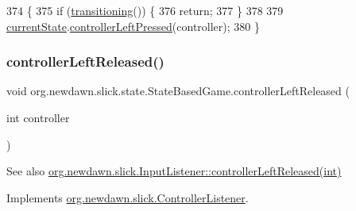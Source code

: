 \begin{DoxyCode}
374                                                       \{
375         \textcolor{keywordflow}{if} (\mbox{\hyperlink{classorg_1_1newdawn_1_1slick_1_1state_1_1_state_based_game_ae869c08778875776081935a090d4c92f}{transitioning}}()) \{
376             \textcolor{keywordflow}{return};
377         \}
378         
379         \mbox{\hyperlink{classorg_1_1newdawn_1_1slick_1_1state_1_1_state_based_game_a6a45e68094bb9b7ec30b8a8b7d415766}{currentState}}.\mbox{\hyperlink{interfaceorg_1_1newdawn_1_1slick_1_1_controller_listener_abfb38c5d8e44b7613a49cbfaf19d5585}{controllerLeftPressed}}(controller);
380     \}
\end{DoxyCode}
\mbox{\label{classorg_1_1newdawn_1_1slick_1_1state_1_1_state_based_game_ae3b66d6b132b6622fa13c125f806e30b}} 
\subsubsection{\texorpdfstring{controller\+Left\+Released()}{controllerLeftReleased()}}
{\footnotesize\ttfamily void org.\+newdawn.\+slick.\+state.\+State\+Based\+Game.\+controller\+Left\+Released (\begin{DoxyParamCaption}\item[{int}]{controller }\end{DoxyParamCaption})\hspace{0.3cm}{\ttfamily [inline]}}

\begin{DoxySeeAlso}{See also}
\mbox{\hyperlink{interfaceorg_1_1newdawn_1_1slick_1_1_controller_listener_ad2f898f0efe21771a0d9568c454dea0d}{org.\+newdawn.\+slick.\+Input\+Listener\+::controller\+Left\+Released(int)}} 
\end{DoxySeeAlso}


Implements \mbox{\hyperlink{interfaceorg_1_1newdawn_1_1slick_1_1_controller_listener_ad2f898f0efe21771a0d9568c454dea0d}{org.\+newdawn.\+slick.\+Controller\+Listener}}.


